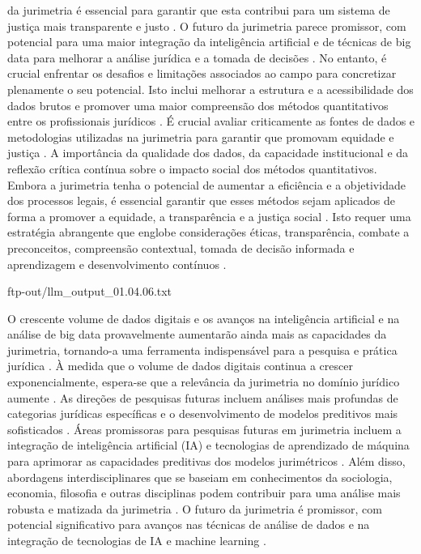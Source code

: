 da jurimetria é essencial para garantir que esta contribui para um sistema de justiça mais transparente e justo \cite{silva2023role, zabala2019d}. O futuro da jurimetria parece promissor, com potencial para uma maior integração da inteligência artificial e de técnicas de big data para melhorar a análise jurídica e a tomada de decisões \cite{silva2023role}. No entanto, é crucial enfrentar os desafios e limitações associados ao campo para concretizar plenamente o seu potencial. Isto inclui melhorar a estrutura e a acessibilidade dos dados brutos e promover uma maior compreensão dos métodos quantitativos entre os profissionais jurídicos \cite{l2010de}. É crucial avaliar criticamente as fontes de dados e metodologias utilizadas na jurimetria para garantir que promovam equidade e justiça \cite{10.1590/dados.2022.65.3.267,10.1057/s41599-020-0396-5}. A importância da qualidade dos dados, da capacidade institucional e da reflexão crítica contínua sobre o impacto social dos métodos quantitativos. Embora a jurimetria tenha o potencial de aumentar a eficiência e a objetividade dos processos legais, é essencial garantir que esses métodos sejam aplicados de forma a promover a equidade, a transparência e a justiça social \cite{10.1590/dados.2022.65.3.267,1023071190721}. Isto requer uma estratégia abrangente que englobe considerações éticas, transparência, combate a preconceitos, compreensão contextual, tomada de decisão informada e aprendizagem e desenvolvimento contínuos \cite{10.1590/dados.2022.65.3.267,1023071190721}. 

ftp-out/llm_output_01.04.06.txt 

O crescente volume de dados digitais e os avanços na inteligência artificial e na análise de big data provavelmente aumentarão ainda mais as capacidades da jurimetria, tornando-a uma ferramenta indispensável para a pesquisa e prática jurídica \cite{silva2023papel}. À medida que o volume de dados digitais continua a crescer exponencialmente, espera-se que a relevância da jurimetria no domínio jurídico aumente \cite{silva2023role}. As direções de pesquisas futuras incluem análises mais profundas de categorias jurídicas específicas e o desenvolvimento de modelos preditivos mais sofisticados \cite{silva2023role}. Áreas promissoras para pesquisas futuras em jurimetria incluem a integração de inteligência artificial (IA) e tecnologias de aprendizado de máquina para aprimorar as capacidades preditivas dos modelos jurimétricos \cite{silva2023role,nunes2016jurimetria}. Além disso, abordagens interdisciplinares que se baseiam em conhecimentos da sociologia, economia, filosofia e outras disciplinas podem contribuir para uma análise mais robusta e matizada da jurimetria \cite{silva2023role,nunes2016jurimetria}. O futuro da jurimetria é promissor, com potencial significativo para avanços nas técnicas de análise de dados e na integração de tecnologias de IA e machine learning \cite{silva2023role,nunes2016jurimetria}. 

